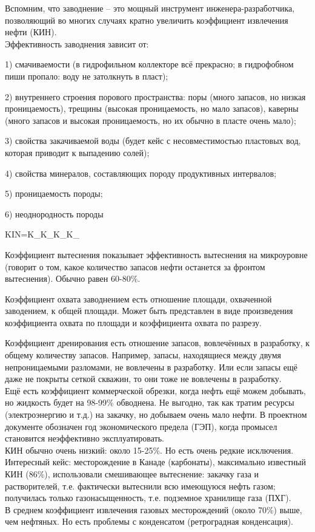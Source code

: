 \documentclass[main.tex]{subfiles}
\begin{document}
Вспомним, что заводнение -- это мощный инструмент инженера-разработчика, позволяющий во многих случаях кратно увеличить коэффициент извлечения нефти (КИН). \\

Эффективность заводнения зависит от:

1) смачиваемости (в гидрофильном коллекторе всё прекрасно; в гидрофобном пиши пропало: воду не затолкнуть в пласт);

2) внутреннего строения порового пространства: поры (много запасов, но низкая проницаемость), трещины (высокая проницаемость, но мало запасов), каверны (много запасов и высокая проницаемость, но их обычно в пласте очень мало);

3) свойства закачиваемой воды (будет кейс с несовместимостью пластовых вод, которая приводит к выпадению солей);

4) свойства минералов, составляющих породу продуктивных интервалов;

5) проницаемость породы;

6) неоднородность породы


\beq
KIN=K_{}\cdot K_{}\cdot K_{}\cdot K_{}
\eeq

Коэффициент вытеснения показывает эффективность вытеснения на микроуровне (говорит о том, какое количество запасов нефти останется за фронтом вытеснения). Обычно равен 60-80\%. 

Коэффициент охвата заводнением есть отношение площади, охваченной заводением, к общей площади. Может быть представлен в виде произведения коэффициента охвата по площади и коэффициента охвата по разрезу.

Коэффициент дренирования есть отношение запасов, вовлечённых в разработку, к общему количеству запасов. Например, запасы, находящиеся между двумя непроницаемыми разломами, не вовлечены в разработку. Или если запасы ещё даже не покрыты сеткой скважин, то они тоже не вовлечены в разработку.\\

Ещё есть коэффициент коммерческой обрезки, когда нефть ещё можем добывать, но жидкость будет на 98-99\% обводнена. Не выгодно, так как тратим ресурсы (электроэнергию и т.д.) на закачку, но добываем очень мало нефти. В проектном документе обозначен год экономического предела (ГЭП), когда промысел становится неэффективно эксплуатировать.\\ 

КИН обычно очень низкий: около 15-25\%. Но есть очень редкие исключения.\\

Интересный кейс: месторождение в Канаде (карбонаты), максимально известный КИН (86\%), использовали смешивающее вытеснение: закачку газа и растворителей, т.е. фактически вытеснили всю имеющуюся нефть газом; получилась только газонасыщенность, т.е. подземное хранилище газа (ПХГ).\\

В среднем коэффициент извлечения газовых месторождений (около 70\%) выше, чем нефтяных. Но есть проблемы с конденсатом (ретроградная конденсация).

\end{document}
